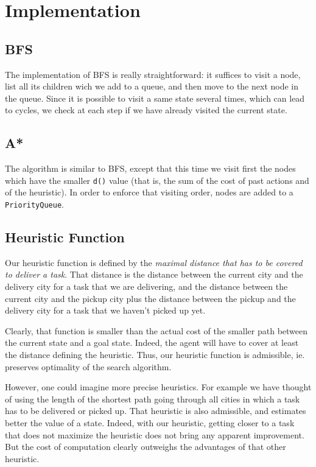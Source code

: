 \documentclass[11pt]{article}
\begin{document}
\section{Implementation}

\subsection{BFS}
The implementation of BFS is really straightforward: it suffices to visit a node, list all its children wich we add to a queue, and then move to the next node in the queue. Since it is possible to visit a same state several times, which can lead to cycles, we check at each step if we have already visited the current state.

\subsection{A*}
The algorithm is similar to BFS, except that this time we visit first the nodes which have the smaller \texttt{d()} value (that is, the sum of the cost of past actions and of the heuristic). In order to enforce that visiting order, nodes are added to a \texttt{PriorityQueue}. 

\subsection{Heuristic Function}
Our heuristic function is defined by the \emph{maximal distance that has to be covered to deliver a task}. That distance is the distance between the current city and the delivery city for a task that we are delivering, and the distance between the current city and the pickup city plus the distance between the pickup and the delivery city for a task that we haven't picked up yet. 

Clearly, that function is smaller than the actual cost of the smaller path between the current state and a goal state. Indeed, the agent will have to cover at least the distance defining the heuristic. Thus, our heuristic function is admissible, ie. preserves optimality of the search algorithm.

However, one could imagine more precise heuristics. For example we have thought of using the length of the shortest path going through all cities in which a task has to be delivered or picked up. That heuristic is also admissible, and estimates better the value of a state. Indeed, with our heuristic, getting closer to a task that does not maximize the heuristic does not bring any apparent improvement. But the cost of computation clearly outweighs the advantages of that other heuristic.
\end{document}
